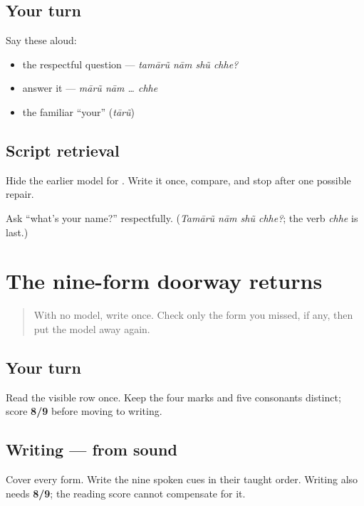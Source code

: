 \subsection*{Your turn}
Say these aloud:

\begin{itemize}
\raggedright
  \item the respectful question — \emph{tamārũ nām shũ chhe?}
  \item answer it — \emph{mārũ nām … chhe}
  \item the familiar \textquotedblleft{}your\textquotedblright{} (\emph{tārũ})
\end{itemize}

\subsection*{Script retrieval}
Hide the earlier model for \textbf{}. Write it once, compare, and stop after one possible repair.

\begin{tcolorbox}[breakable,colback=teal!4,colframe=teal!35!black,title={Before you move on}]
Ask \textquotedblleft{}what's your name?\textquotedblright{} respectfully. (\emph{Tamārũ nām shũ chhe?}; the verb \emph{chhe} is last.)
\end{tcolorbox}
\section[\texorpdfstring{\gu{જ} \gu{ો} \gu{ં} \gu{ી} \gu{ુ} \gu{છ} \gu{ક} \gu{ણ} \gu{શ} (ja — o sign …)}{જ ો ં ી ુ છ ક ણ શ (ja — o sign …)}]{The nine-form doorway returns}

\label{lesson:GU-R04-doorway-nine-r2}



\begin{quote}
With no model, write \textbf{  } once. Check only the form you missed, if any, then put the model away again.
\end{quote}

\subsection*{Your turn}
Read the visible row once. Keep the four marks and five consonants distinct; score \textbf{8/9} before moving to writing.

\subsection*{Writing — from sound}
Cover every form. Write the nine spoken cues in their taught order. Writing also needs \textbf{8/9}; the reading score cannot compensate for it.


